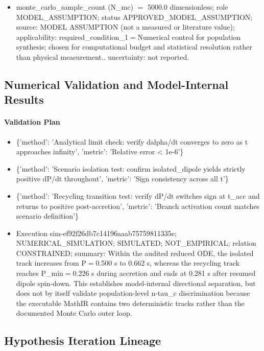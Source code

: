 \documentclass[11pt]{article}
\begin{document}
\begin{itemize}
\item monte\_carlo\_sample\_count (N\_mc) \ensuremath{=} 5000.0 dimensionless; role MODEL\_ASSUMPTION; status APPROVED\_MODEL\_ASSUMPTION; source: MODEL ASSUMPTION (not a measured or literature value); applicability: required\_condition\_1\ensuremath{=}Numerical control for population synthesis; chosen for computational budget and statistical resolution rather than physical measurement.. uncertainty: not reported.
\end{itemize}

\subsection{Numerical Validation and Model-Internal Results}

\paragraph{Validation Plan}
\begin{itemize}
\item \{'method': 'Analytical limit check: verify dalpha/dt converges to zero as t approaches infinity', 'metric': 'Relative error < 1e-6'\}
\item \{'method': 'Scenario isolation test: confirm isolated\_dipole yields strictly positive dP/dt throughout', 'metric': 'Sign consistency across all t'\}
\item \{'method': 'Recycling transition test: verify dP/dt switches sign at t\_acc and returns to positive post-accretion', 'metric': 'Branch activation count matches scenario definition'\}
\end{itemize}

\begin{itemize}
\item Execution sim-ef92f26db7c14196aaab75759811335e; NUMERICAL\_SIMULATION; SIMULATED; NOT\_EMPIRICAL; relation CONSTRAINED; summary: Within the audited reduced ODE, the isolated track increases from P\ensuremath{=}0.500 s to 0.662 s, whereas the recycling track reaches P\_min\ensuremath{=}0.226 s during accretion and ends at 0.281 s after resumed dipole spin-down. This establishes model-internal directional separation, but does not by itself validate population-level n-tau\_c discrimination because the executable MathIR contains two deterministic tracks rather than the documented Monte Carlo outer loop.
\end{itemize}

\subsection{Hypothesis Iteration Lineage}
\end{document}
